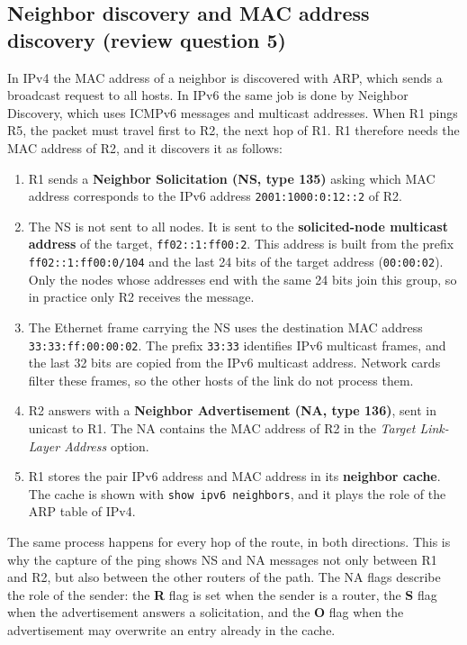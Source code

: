 \subsection{Neighbor discovery and MAC address discovery (review question 5)}
\label{sec:lab01-ns-na}

In IPv4 the MAC address of a neighbor is discovered with ARP, which sends a broadcast request to all hosts. In IPv6 the same job is done by Neighbor Discovery, which uses ICMPv6 messages and multicast addresses. When R1 pings R5, the packet must travel first to R2, the next hop of R1. R1 therefore needs the MAC address of R2, and it discovers it as follows:

\begin{enumerate}
\item R1 sends a \textbf{Neighbor Solicitation (NS, type 135)} asking which MAC address corresponds to the IPv6 address \texttt{2001:1000:0:12::2} of R2.
\item The NS is not sent to all nodes. It is sent to the \textbf{solicited-node multicast address} of the target, \texttt{ff02::1:ff00:2}. This address is built from the prefix \texttt{ff02::1:ff00:0/104} and the last 24 bits of the target address (\texttt{00:00:02}). Only the nodes whose addresses end with the same 24 bits join this group, so in practice only R2 receives the message.
\item The Ethernet frame carrying the NS uses the destination MAC address \texttt{33:33:ff:00:00:02}. The prefix \texttt{33:33} identifies IPv6 multicast frames, and the last 32 bits are copied from the IPv6 multicast address. Network cards filter these frames, so the other hosts of the link do not process them.
\item R2 answers with a \textbf{Neighbor Advertisement (NA, type 136)}, sent in unicast to R1. The NA contains the MAC address of R2 in the \emph{Target Link-Layer Address} option.
\item R1 stores the pair IPv6 address and MAC address in its \textbf{neighbor cache}. The cache is shown with \texttt{show ipv6 neighbors}, and it plays the role of the ARP table of IPv4.
\end{enumerate}

The same process happens for every hop of the route, in both directions. This is why the capture of the ping shows NS and NA messages not only between R1 and R2, but also between the other routers of the path. The NA flags describe the role of the sender: the \textbf{R} flag is set when the sender is a router, the \textbf{S} flag when the advertisement answers a solicitation, and the \textbf{O} flag when the advertisement may overwrite an entry already in the cache.

